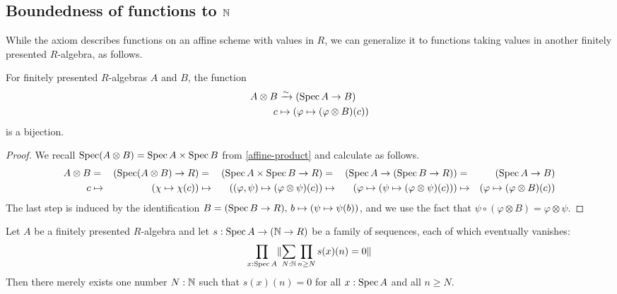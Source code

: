\subsection{Boundedness of functions to $\mathbb{N}$}

While the axiom 
describes functions on an affine scheme
with values in $R$,
we can generalize it to functions taking values
in another finitely presented $R$-algebra,
as follows.

\begin{lemma}%
  \label{algebra-valued-functions-on-affine}
  For finitely presented $R$-algebras $A$ and $B$,
  the function
  \begin{align*}
    A \otimes B &\xrightarrow{\sim} (\operatorname{Spec} A \to B) \\
    c &\mapsto (\varphi \mapsto (\varphi \otimes B)(c))
  \end{align*}
  is a bijection.
\end{lemma}

\begin{proof}
  We recall $\operatorname{Spec} (A \otimes B) = \operatorname{Spec} A \times \operatorname{Spec} B$
  from \cref{affine-product}
  and calculate as follows.
  \begin{align*}
    A \otimes B
    &=& (\operatorname{Spec} (A \otimes B) \to R)
    &=& (\operatorname{Spec} A \times \operatorname{Spec} B \to R)
    &=& (\operatorname{Spec} A \to (\operatorname{Spec} B \to R))
    &=& (\operatorname{Spec} A \to B) \\
    c
    &\mapsto& (\chi \mapsto \chi(c))
    &\mapsto& ((\varphi, \psi) \mapsto (\varphi \otimes \psi)(c))
    &\mapsto& (\varphi \mapsto (\psi \mapsto (\varphi \otimes \psi)(c)))
    &\mapsto& (\varphi \mapsto (\varphi \otimes B)(c))
  \end{align*}
  The last step is induced by the identification
  $B = (\operatorname{Spec} B \to R),\, b \mapsto (\psi \mapsto \psi(b))$,
  and we use the fact that
  $\psi \circ (\varphi \otimes B) = \varphi \otimes \psi$.
\end{proof}

\begin{lemma}%
  \label{eventually-vanishing-sequence-on-affine}
  Let $A$ be a finitely presented $R$-algebra
  and let $s : \operatorname{Spec} A \to (\mathbb{N} \to R)$
  be a family of sequences,
  each of which eventually vanishes:
  \[ \prod_{x : \operatorname{Spec} A} \lVert \sum_{N : \mathbb{N}} \prod_{n \geq N} s(x)(n) = 0 \rVert \]
  Then there merely exists one number $N : \mathbb{N}$
  such that $s(x)(n) = 0$ for all $x : \operatorname{Spec} A$ and all $n \geq N$.
\end{lemma}


